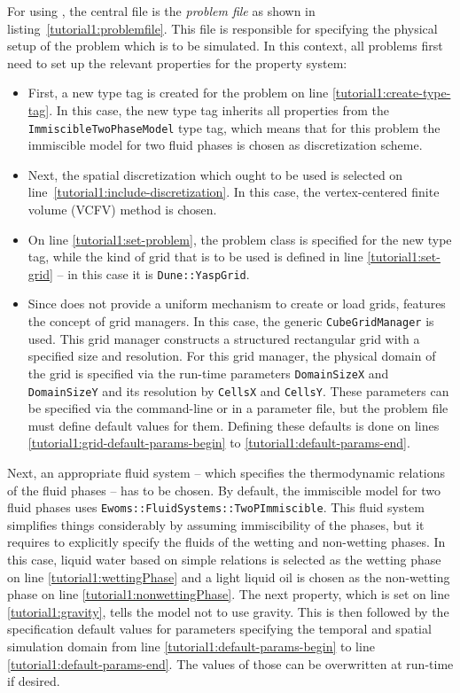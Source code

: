 For using \eWoms, the central file is the \textit{problem file} as
shown in listing~\ref{tutorial1:problemfile}. This file is responsible
for specifying the physical setup of the problem which is to be
simulated. In this context, all problems first need to set up the
relevant properties for the \eWoms property system:
\begin{itemize}
\item First, a new type tag is created for the problem on line
  \ref{tutorial1:create-type-tag}.  In this case, the new type
  tag inherits all properties from the \texttt{ImmiscibleTwoPhaseModel}
  type tag, which means that for this problem the immiscible model
  for two fluid phases is chosen as discretization scheme.
\item Next, the spatial discretization which ought to be used is
  selected on line~\ref{tutorial1:include-discretization}. In this
  case, the vertex-centered finite volume (VCFV) method is chosen.
\item On line \ref{tutorial1:set-problem}, the problem class is
  specified for the new type tag, while the kind of grid that is to be
  used is defined in line \ref{tutorial1:set-grid} -- in this case
  it is \texttt{Dune::YaspGrid}.
\item Since \Dune does not provide a uniform mechanism to create or
  load grids, \eWoms features the concept of grid managers. In this
  case, the generic \texttt{CubeGridManager} is used. This grid
  manager constructs a structured rectangular grid with a specified
  size and resolution. For this grid manager, the physical domain of
  the grid is specified via the run-time parameters
  \texttt{DomainSizeX} and \texttt{DomainSizeY} and its resolution by
  \texttt{CellsX} and \texttt{CellsY}. These parameters can be
  specified via the command-line or in a parameter file, but the
  problem file must define default values for them. Defining these
  defaults is done on lines \ref{tutorial1:grid-default-params-begin}
  to \ref{tutorial1:default-params-end}.
\end{itemize}

Next, an appropriate fluid system -- which specifies the thermodynamic
relations of the fluid phases -- has to be chosen. By default, the
immiscible model for two fluid phases uses
\texttt{\justifyNoHyphen{}Ewoms::Fluid\-Systems::TwoPImmiscible}. This
fluid system simplifies things considerably by assuming immiscibility
of the phases, but it requires to explicitly specify the fluids of the
wetting and non-wetting phases. In this case, liquid water based on
simple relations is selected as the wetting phase on line
\ref{tutorial1:wettingPhase} and a light liquid oil is chosen as the
non-wetting phase on line \ref{tutorial1:nonwettingPhase}. The next
property, which is set on line \ref{tutorial1:gravity}, tells the
model not to use gravity. This is then followed by the specification
default values for parameters specifying the temporal and spatial
simulation domain from line \ref{tutorial1:default-params-begin} to
line \ref{tutorial1:default-params-end}. The values of those can be
overwritten at run-time if desired.

